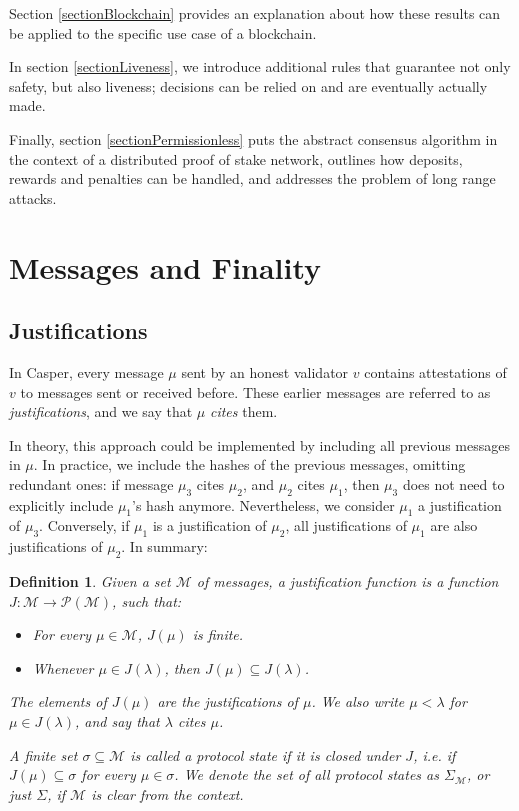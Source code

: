 \documentclass[12pt]{article}
\newtheorem{definition}{Definition}
\begin{document}
Section \ref{sectionBlockchain} provides an explanation about how these results can be applied to the specific use case of a blockchain.

In section \ref{sectionLiveness}, we introduce additional rules that guarantee not only safety, but also liveness; decisions can be relied on and are eventually actually made.

Finally, section \ref{sectionPermissionless} puts the abstract consensus algorithm in the context of a distributed proof of stake network, outlines how deposits, rewards and penalties can be handled, and addresses the problem of long range attacks.

\newpage


\section{Messages and Finality}
\label{sectionMessages}


\subsection{Justifications}

In Casper, every message $\mu$ sent by an honest validator $v$ contains attestations of $v$ to messages sent or received before. These earlier messages are referred to as \emph{justifications}, and we say that $\mu$ \emph{cites} them.

In theory, this approach could be implemented by including all previous messages in $\mu$. In practice, we include the hashes of the previous messages, omitting redundant ones: if message $\mu_3$ cites $\mu_2$, and $\mu_2$ cites $\mu_1$, then $\mu_3$ does not need to explicitly include $\mu_1$'s hash anymore. Nevertheless, we consider $\mu_1$ a justification of $\mu_3$. Conversely, if $\mu_1$ is a justification of $\mu_2$, all justifications of $\mu_1$ are also justifications of $\mu_2$.  In summary:

\begin{definition}
  Given a set $\mathcal{M}$ of \emph{messages}, a \emph{justification function} is a function $J: \mathcal{M} \rightarrow \mathcal{P}(\mathcal{M})$, such that:
  \begin{itemize}
    \item For every $\mu \in \mathcal{M}$, $J(\mu)$ is finite.
    \item Whenever $\mu \in J(\lambda)$, then $J(\mu) \subseteq J(\lambda)$.
  \end{itemize}
  The elements of $J(\mu)$ are the \emph{justifications} of $\mu$. We also write $\mu < \lambda$ for $\mu \in J(\lambda)$, and say that $\lambda$ \emph{cites} $\mu$.

  A finite set $\sigma \subseteq \mathcal{M}$ is called a \emph{protocol state} if it is closed under $J$, i.e. if $J(\mu) \subseteq \sigma$ for every $\mu \in \sigma$. We denote the set of all protocol states as $\Sigma_{\mathcal{M}}$, or just $\Sigma$, if $\mathcal{M}$ is clear from the context.
\end{definition}
\end{document}
